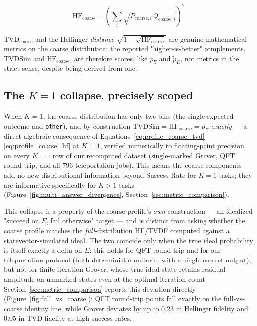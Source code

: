 \begin{equation}
\label{eq:profile_coarse_hf}
    \mathrm{HF}_{\text{coarse}} = \left( \sum_i \sqrt{P_{\text{coarse}, i}\, Q_{\text{coarse}, i}} \right)^2
\end{equation}

$\mathrm{TVD}_{\text{coarse}}$ and the Hellinger \emph{distance} $\sqrt{1-\sqrt{\mathrm{HF}_{\text{coarse}}}}$ are genuine mathematical metrics on the coarse distribution; the reported "higher-is-better" complements, $\mathrm{TVDSim}$ and $\mathrm{HF}_{\text{coarse}}$, are therefore scores, like $p_E$ and $\tilde{p}_E$, not metrics in the strict sense, despite being derived from one.

\subsection{The $K=1$ collapse, precisely scoped}

When $K=1$, the coarse distribution has only two bins (the single expected outcome and \texttt{other}), and by construction $\mathrm{TVDSim} = \mathrm{HF}_{\text{coarse}} = p_E$ \emph{exactly} --- a direct algebraic consequence of Equations~\eqref{eq:profile_coarse_tvd}--\eqref{eq:profile_coarse_hf} at $K=1$, verified numerically to floating-point precision on every $K=1$ row of our recomputed dataset (single-marked Grover, QFT round-trip, and all 796 teleportation jobs). This means the coarse components add no new distributional information beyond Success Rate for $K=1$ tasks; they are informative specifically for $K>1$ tasks (Figure~\ref{fig:multi_answer_divergence}, Section~\ref{sec:metric_comparison}).

This collapse is a property of the coarse profile's \emph{own} construction --- an idealized "succeed on $E$, fail otherwise" target --- and is distinct from asking whether the coarse profile matches the \emph{full}-distribution HF/TVDF computed against a statevector-simulated ideal. The two coincide only when the true ideal probability is itself exactly a delta on $E$: this holds for QFT round-trip and for our teleportation protocol (both deterministic unitaries with a single correct output), but not for finite-iteration Grover, whose true ideal state retains residual amplitude on unmarked states even at the optimal iteration count. Section~\ref{sec:metric_comparison} reports this deviation directly (Figure~\ref{fig:full_vs_coarse}): QFT round-trip points fall exactly on the full-vs-coarse identity line, while Grover deviates by up to $0.23$ in Hellinger fidelity and $0.05$ in TVD fidelity at high success rates.


